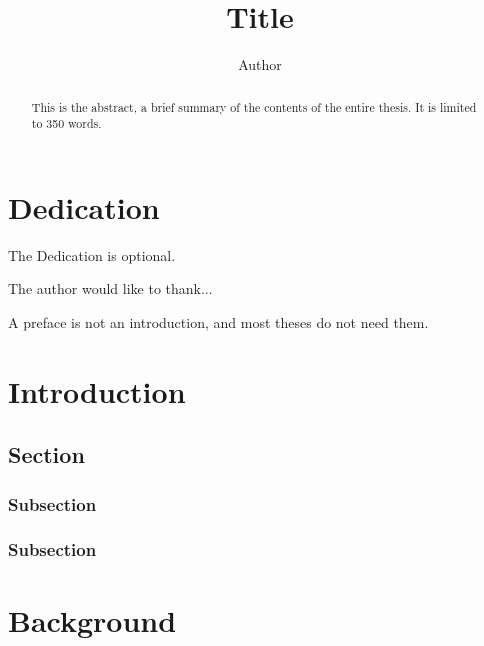 \documentclass[12pt]{report}
\title{Title}
\author{Author}
\begin{document}

\maketitle    %

\begin{abstract}
This is the abstract, a brief summary of the contents of the entire thesis.
It is limited to 350 words.
\end{abstract}


\chapter*{Dedication}

The Dedication is optional.



The author would like to thank...



A preface is not an introduction, and most theses do not need them.


\tableofcontents

\listoffigures  %
\listoftables   %

\newpage


\chapter{Introduction}

\section{Section}

\subsection{Subsection}

\subsection{Subsection}

\chapter{Background}
\end{document}
